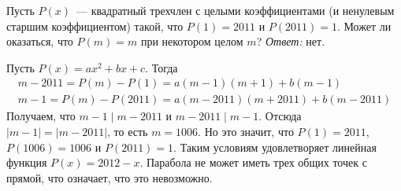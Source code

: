 \problem
Пусть $P(x)$~--- квадратный трехчлен с целыми коэффициентами
(и ненулевым старшим коэффициентом) такой, что $P(1) = 2011$ и $P(2011) = 1$.
Может ли оказаться, что $P(m) = m$ при некотором целом $m$?
\solution
\emph{Ответ:} нет.
\par
Пусть $P(x) = a x^2 + b x + c$.
Тогда
\begin{gather*}
    m - 2011 = P(m) - P(1) = a (m - 1) (m + 1) + b (m - 1)
\\
    m - 1 = P(m) - P(2011) = a (m - 2011) (m + 2011) + b (m - 2011)
\end{gather*}
Получаем, что $m - 1 \mid m - 2011$ и $m - 2011 \mid m - 1$.
Отсюда $|m - 1| = |m - 2011|$, то есть $m = 1006$.
Но это значит, что
$P(1) = 2011$, $P(1006) = 1006$ и $P(2011) = 1$.
Таким условиям удовлетворяет линейная функция $P(x) = 2012 - x$.
Парабола не может иметь трех общих точек с прямой, что означает, что это
невозможно.
\endproblem
